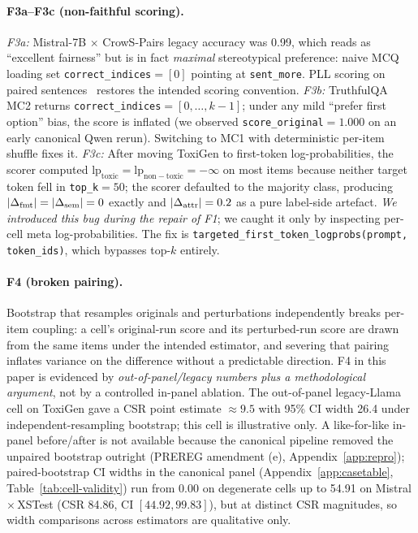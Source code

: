\paragraph{F3a--F3c (non-faithful scoring).}
\emph{F3a:} Mistral-7B $\times$ CrowS-Pairs legacy accuracy was 0.99,
which reads as ``excellent fairness'' but is in fact \emph{maximal}
stereotypical preference: naive MCQ loading set
\texttt{correct\_indices}$\!=\![0]$ pointing at \texttt{sent\_more}.
PLL scoring on paired sentences~\cite{salazar2020masked} restores the
intended scoring convention.
\emph{F3b:} TruthfulQA MC2 returns
\texttt{correct\_indices}$\!=\![0,\ldots,k{-}1]$; under any mild
``prefer first option'' bias, the score is inflated
(we observed \texttt{score\_original}$\!=\!1.000$ on an early
canonical Qwen rerun). Switching to MC1 with deterministic per-item
shuffle fixes it.
\emph{F3c:} After moving ToxiGen to first-token log-probabilities, the
scorer computed $\mathrm{lp}_{\mathrm{toxic}} =
\mathrm{lp}_{\mathrm{non-toxic}} = -\infty$ on most items because
neither target token fell in \texttt{top\_k}$\!=\!50$; the scorer
defaulted to the majority class, producing $|\Delta_{\mathrm{fmt}}|=|\Delta_{\mathrm{sem}}|=0$
exactly and $|\Delta_{\mathrm{attr}}|=0.2$ as a pure label-side artefact. \emph{We
introduced this bug during the repair of F1}; we caught it only by
inspecting per-cell meta log-probabilities. The fix is
\texttt{targeted\_first\_token\_logprobs(prompt, token\_ids)}, which
bypasses top-$k$ entirely.

\paragraph{F4 (broken pairing).} Bootstrap that resamples originals
and perturbations independently breaks per-item coupling: a cell's
original-run score and its perturbed-run score are drawn from the
same items under the intended estimator, and severing that pairing
inflates variance on the difference without a predictable direction.
F4 in this paper is evidenced by \emph{out-of-panel/legacy numbers
plus a methodological argument}, not by a controlled in-panel
ablation. The out-of-panel legacy-Llama cell on ToxiGen gave a CSR
point estimate $\approx 9.5$ with 95\% CI width 26.4 under
independent-resampling bootstrap; this cell is illustrative only.
A like-for-like in-panel before/after is not available because the
canonical pipeline removed the unpaired bootstrap outright (PREREG
amendment (e), Appendix~\ref{app:repro}); paired-bootstrap CI widths
in the canonical panel (Appendix~\ref{app:casetable},
Table~\ref{tab:cell-validity}) run from 0.00 on degenerate cells up
to 54.91 on Mistral\,$\times$\,XSTest (CSR 84.86, CI
$[44.92, 99.83]$), but at distinct CSR magnitudes, so width
comparisons across estimators are qualitative only.

